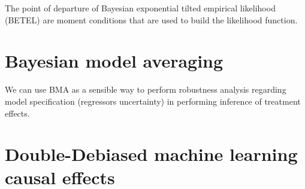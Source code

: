 The point of departure of Bayesian exponential tilted empirical likelihood (BETEL) are moment conditions that are used to build the likelihood function.

\section{Bayesian model averaging}\label{sec12_8}
We can use BMA as a sensible way to perform robustness analysis regarding model specification (regressors uncertainty) in performing inference of treatment effects.

\section{Double-Debiased machine learning causal effects}\label{sec12_9}
